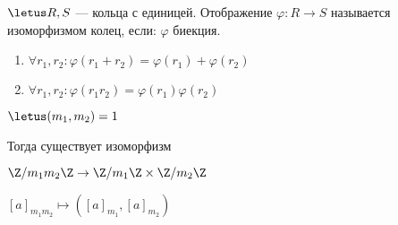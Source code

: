 \begin{defn}
    $\letus R, S$ --- кольца с единицей. Отображение $\varphi: R \to S$ называется изоморфизмом колец, если: $\varphi$ биекция.
    
    \begin{enumerate}
        \item $\forall r_1, r_2: \varphi(r_1 + r_2) = \varphi(r_1) + \varphi(r_2)$
        
        \item $\forall r_1, r_2: \varphi(r_1 r_2) = \varphi(r_1) \varphi(r_2)$
    \end{enumerate}
\end{defn}

\begin{theorem-non}
    $\letus (m_1, m_2) = 1$ 

    Тогда существует изоморфизм 
    
    $\Z/m_1m_2\Z \to \Z/m_1\Z \times \Z/m_2\Z$
    
    $[a]_{m_1m_2} \mapsto ([a]_{m_1}, [a]_{m_2})$
\end{theorem-non}

